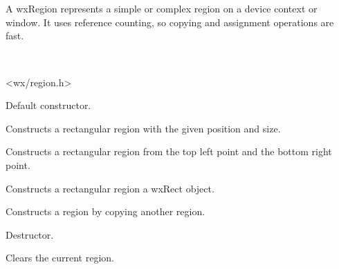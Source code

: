 \section{}\label{wxregion}

A wxRegion represents a simple or complex region on a device context or window. It uses
reference counting, so copying and assignment operations are fast.


\\


<wx/region.h>




\label{wxregionconstr}


Default constructor.


Constructs a rectangular region with the given position and size.


Constructs a rectangular region from the top left point and the bottom right point.


Constructs a rectangular region a wxRect object.


Constructs a region by copying another region.



Destructor.

\label{wxregionclear}


Clears the current region.

\label{wxregioncontains}

